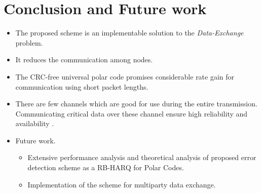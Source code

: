 \documentclass[
11pt, %
a4paper, %
oneside, %
headinclude,footinclude, %
BCOR5mm, %
]{scrartcl}
\begin{document}
\section{Conclusion and Future work}\label{future}
\begin{itemize}
\item The proposed scheme is an implementable solution to the \emph{Data-Exchange} problem.
\item It reduces the communication among nodes.
\item The CRC-free universal polar code promises considerable rate gain for communication using short packet lengths. 
\item There are few channels which are good for use during the entire transmission. Communicating critical data over these channel ensure high reliability and availability . 
\end{itemize}
\begin{itemize}
\item Future work.
\begin{itemize}
\item Extensive performance analysis and theoretical analysis of proposed error detection scheme as a RB-HARQ for Polar Codes.
\item Implementation of the scheme for multiparty data exchange.
\end{itemize}
\end{itemize}




\clearpage




\end{document}
